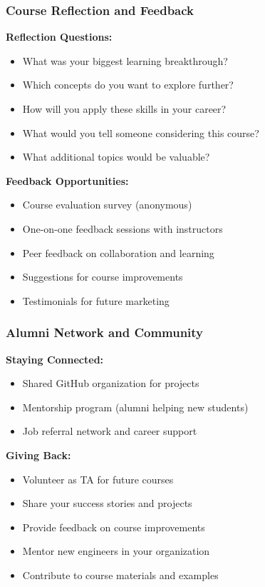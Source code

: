 \documentclass{beamer}
\begin{document}
\begin{frame}
\frametitle{Course Reflection and Feedback}
\textbf{Reflection Questions:}
\begin{itemize}
    \item What was your biggest learning breakthrough?
    \item Which concepts do you want to explore further?
    \item How will you apply these skills in your career?
    \item What would you tell someone considering this course?
    \item What additional topics would be valuable?
\end{itemize}

\vspace{0.5cm}
\textbf{Feedback Opportunities:}
\begin{itemize}
    \item Course evaluation survey (anonymous)
    \item One-on-one feedback sessions with instructors
    \item Peer feedback on collaboration and learning
    \item Suggestions for course improvements
    \item Testimonials for future marketing
\end{itemize}
\end{frame}

\begin{frame}
\frametitle{Alumni Network and Community}
\textbf{Staying Connected:}
\begin{itemize}
    \item Shared GitHub organization for projects
    \item Mentorship program (alumni helping new students)
    \item Job referral network and career support
\end{itemize}

\vspace{0.5cm}
\textbf{Giving Back:}
\begin{itemize}
    \item Volunteer as TA for future courses
    \item Share your success stories and projects
    \item Provide feedback on course improvements
    \item Mentor new engineers in your organization
    \item Contribute to course materials and examples
\end{itemize}
\end{frame}
\end{document}
